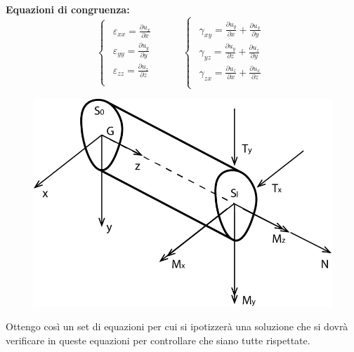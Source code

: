 	\textbf{Equazioni di congruenza:}
\[ 
\begin{cases}
	\begin{aligned}
		\varepsilon_{xx} =   \frac{\partial u_x}{\partial x} \\
		\varepsilon_{yy} =   \frac{\partial u_y}{\partial y} \\
		\varepsilon_{zz} =   \frac{\partial u_z}{\partial z} \\
	\end{aligned}
\end{cases} \hspace{1cm} \begin{cases}
	\begin{aligned}
		\gamma_{xy} =   \frac{\partial u_y}{\partial x} + \frac{\partial u_x}{\partial y} \\
		\gamma_{yz} =   \frac{\partial u_y}{\partial z} + \frac{\partial u_z}{\partial y} \\
		\gamma_{zx} =   \frac{\partial u_z}{\partial x} + \frac{\partial u_x}{\partial z} \\
	\end{aligned}
\end{cases}
\]
\begin{figure}[H]
	\centering
	\includegraphics[width=0.5\linewidth]{Immagini_2/screenshot002}
	\label{fig:screenshot002}
\end{figure}
Ottengo così un set di equazioni per cui si ipotizzerà una soluzione che si dovrà verificare in queste equazioni per controllare che siano tutte rispettate. \newline 

